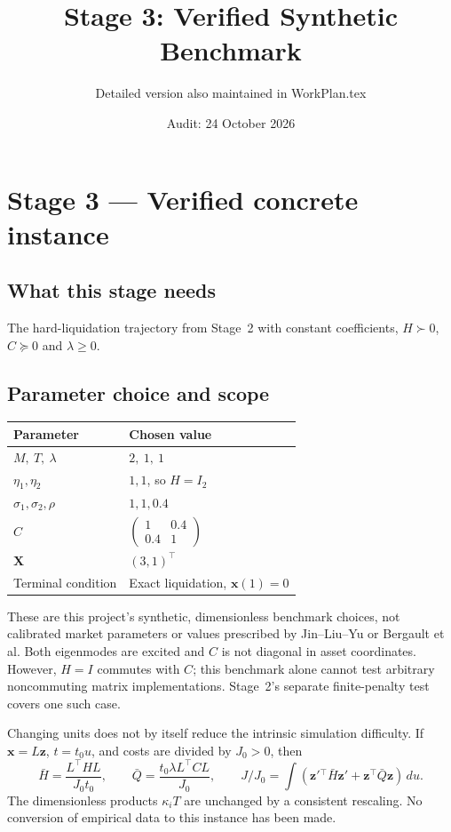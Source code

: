 \documentclass[11pt,a4paper]{article}
\title{Stage 3: Verified Synthetic Benchmark}
\author{Detailed version also maintained in WorkPlan.tex}
\date{Audit: 24 October 2026}
\begin{document}
\maketitle
\section{Stage 3 --- Verified concrete instance}
\label{sec:stage3}

\subsection*{What this stage needs}

The hard-liquidation trajectory from Stage~2 with constant coefficients,
$H\succ0$, $C\succeq0$ and $\lambda\ge0$.

\subsection*{Parameter choice and scope}

\begin{center}
\begin{tabular}{@{}ll@{}}
\toprule
Parameter & Chosen value \\
\midrule
$M,\ T,\ \lambda$ & $2,\ 1,\ 1$ \\
$\eta_1,\eta_2$ & $1,1$, so $H=I_2$ \\
$\sigma_1,\sigma_2,\rho$ & $1,1,0.4$ \\
$C$ & $\left(\begin{smallmatrix}1&0.4\\0.4&1\end{smallmatrix}\right)$ \\
$\mathbf X$ & $(3,1)^\top$ \\
Terminal condition & Exact liquidation, $\mathbf x(1)=0$ \\
\bottomrule
\end{tabular}
\end{center}

These are this project's synthetic, dimensionless benchmark choices, not
calibrated market parameters or values prescribed by Jin--Liu--Yu or Bergault
et al. Both eigenmodes are excited and $C$ is not diagonal in asset
coordinates. However, $H=I$ commutes with $C$; this benchmark alone cannot
test arbitrary noncommuting matrix implementations. Stage~2's separate
finite-penalty test covers one such case.

Changing units does not by itself reduce the intrinsic simulation difficulty.
If $\mathbf x=L\mathbf z$, $t=t_0u$, and costs are divided by $J_0>0$, then
\[
 \bar H=\frac{L^\top HL}{J_0t_0},\qquad
 \bar Q=\frac{t_0\lambda L^\top CL}{J_0},\qquad
 J/J_0=\int(\mathbf z'{}^\top\bar H\mathbf z'
               +\mathbf z^\top\bar Q\mathbf z)\,du.
\]
The dimensionless products $\kappa_iT$ are unchanged by a consistent
rescaling. No conversion of empirical data to this instance has been made.
\end{document}
